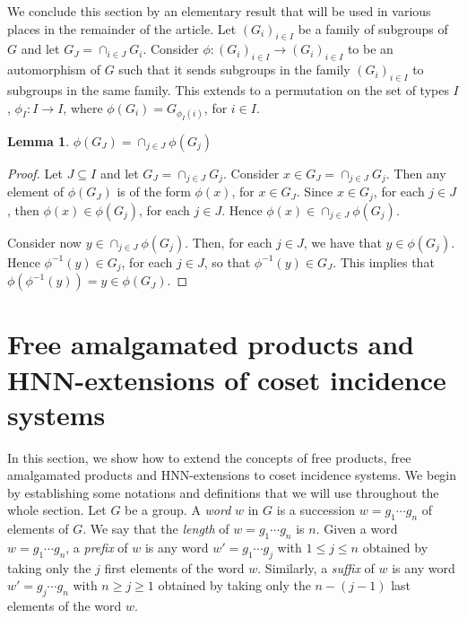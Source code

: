 \documentclass[11pt,letterpaper]{amsart}
\newtheorem{lemma}[prop]{Lemma}
\begin{document}
We conclude this section by an elementary result that will be used in various places in the remainder of the article. Let $(G_i)_{i\in I}$ be a family of subgroups of $G$ and let $G_J = \cap_{i\in J}G_i$.
Consider $\phi : (G_i)_{i\in I} \rightarrow (G_i)_{i\in I}$ to be an automorphism of $G$ such that it sends subgroups in the family $(G_i)_{i\in I}$ to subgroups in the same family.
This extends to a permutation on the set of types $I$, $\phi_I: I\rightarrow I$, where $\phi(G_i)=G_{\phi_I(i)}$, for $i\in I$. 

\begin{lemma}\label{lem:lattice}
    $\phi(G_J)=\cap_{j\in J} \phi(G_j)$
\end{lemma}
\begin{proof}
    Let $J\subseteq I$ and let $G_J=\cap_{j\in J} G_j$.
    Consider $x\in G_J= \cap_{j\in J} G_j $. Then any element of $\phi(G_J)$ is of the form $\phi(x)$, for $x\in G_J$. Since $x\in G_j$, for each $j\in J$, then $\phi(x)\in \phi(G_j)$, for each $j\in J$. Hence $\phi(x)\in \cap_{j\in J} \phi(G_j)$.

    Consider now $y\in \cap_{j\in J} \phi(G_j)$. Then, for each $j\in J$, we have that $y\in \phi(G_j)$. Hence $\phi^{-1}(y)\in G_j$, for each $j\in J$, so that $\phi^{-1}(y)\in G_J$. This implies that $\phi(\phi^{-1}(y)) = y\in \phi(G_J)$.
\end{proof}


\section{Free amalgamated products and HNN-extensions of coset incidence systems}\label{sec:Amalgams+HNN}

In this section, we show how to extend the concepts of free products, free amalgamated products and HNN-extensions to coset incidence systems.
We begin by establishing some notations and definitions that we will use throughout the whole section. Let $G$ be a group. A \textit{word} $w$ in $G$ is a succession $w = g_1 \cdots g_n$ of elements of $G$. We say that the \textit{length} of $w = g_1 \cdots g_n $ is $n$. Given a word $w = g_1 \cdots g_n$, a \textit{prefix} of $w$ is any word $w'= g_1 \cdots g_j$ with $ 1 \leq j \leq n$ obtained by taking only the $j$ first elements of the word $w$. Similarly, a \textit{suffix} of $w$ is any word $w'= g_j \cdots g_n$ with $n \geq j \geq 1$ obtained by taking only the $n-(j-1)$ last elements of the word $w$. 
\end{document}
